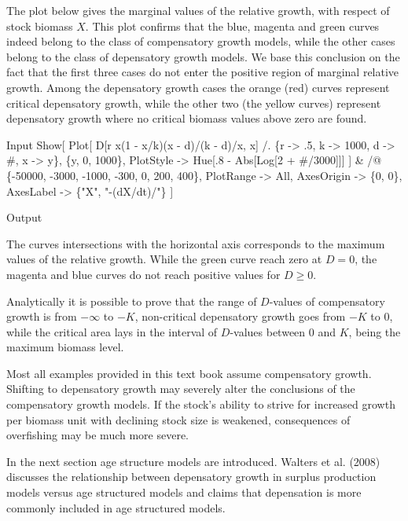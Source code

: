 \documentclass[11pt,fleqn]{book} %
\begin{document}
\begin{theorem}
The plot below gives the marginal values of the relative growth, with respect of stock biomass $X$. This plot confirms that the blue, magenta and green curves indeed belong to the class of compensatory growth models, while the other cases belong to the class of depensatory growth models. We base this conclusion on the fact that the first three cases do not enter the positive region of marginal relative growth. Among the depensatory growth cases the orange (red) curves represent critical depensatory growth, while the other two (the yellow curves) represent depensatory growth where no critical biomass values above zero are found.
\begin{mmaCell}[index=1]{Input}
  Show[
    Plot[
      D[r x(1 - x/k)(x - d)/(k - d)/x, x] /. 
      \{r -> .5, k -> 1000, d -> #, x -> y\}, \{y, 0, 1000\}, 
      PlotStyle -> Hue[.8 - Abs[Log[2 + #/3000]]]
    ] & /@ \{-50000, -3000, -1000, -300, 0, 200, 400\}, 
    PlotRange -> All, AxesOrigin -> \{0, 0\}, 
    AxesLabel -> \{"X", "-(dX/dt)/"\}
  ]
\end{mmaCell}
\begin{mmaCell}[moregraphics={moreig={scale=.7}}]{Output}
\end{mmaCell}
The curves intersections with the horizontal axis corresponds to the maximum values of the relative growth. While the green curve reach zero at $D = 0$, the magenta and blue curves do not reach positive values for $D \geq 0$.

Analytically it is possible to prove that the range of $D$-values of compensatory growth is from $-\infty$ to $-K$, non-critical depensatory growth goes from $-K$ to $0$, while the critical area lays in the interval of $D$-values between $0$ and $K$, being the maximum biomass level.
\label{code:depensation}
\end{theorem}

Most all examples provided in this text book assume compensatory growth. Shifting to depensatory growth may severely alter the conclusions of the compensatory growth models. If the stock's ability to strive for increased growth per biomass unit with declining stock size is weakened,  consequences of overfishing may be much more severe.

In the next section age structure models are introduced. Walters et al. (2008)\cite{Walters2008} discusses the relationship between depensatory growth in surplus production models versus age structured models and claims that depensation is more commonly included in age structured models.
\end{document}
